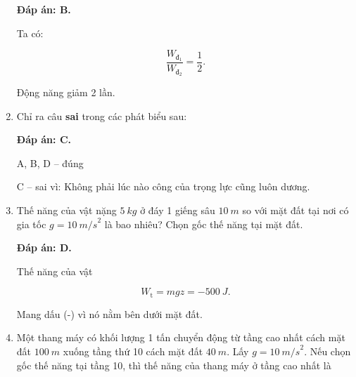 \begin{enumerate}[label=\bfseries Câu \arabic*:, leftmargin=1.5cm]
	\hideall
	{	
		\textbf{Đáp án: B.}
		
		Ta có:
		
		$$\dfrac{W_{\text{đ}_1}}{W_{\text{đ}_2}} = \dfrac{1}{2}.$$
		
		Động năng giảm 2 lần.
	}
	\item {}
	
	
	{Chỉ ra câu \textbf{sai} trong các phát biểu sau:
	}
	
	\hideall
	{	
		\textbf{Đáp án: C.}
		
		A, B, D – đúng
		
		C – sai vì: Không phải lúc nào công của trọng lực cũng luôn dương.
	}
	\item {}
	
	
	{Thế năng của vật nặng $\SI{5}{kg}$ ở đáy 1 giếng sâu $\SI{10}{m}$ so với mặt đất tại nơi có gia tốc $g = \SI{10}{m/s}^2$ là bao nhiêu? Chọn gốc thế năng tại mặt đất.
	}
	
	\hideall
	{	
		\textbf{Đáp án: D.}
		
		Thế năng của vật
		
		$$W_\text{t} = mgz = -\SI{500}{J}.$$
		
		Mang dấu (-)  vì nó nằm bên dưới mặt đất.
	}
	\item {}
	
	
	{Một thang máy có khối lượng 1 tấn chuyển động từ tầng cao nhất cách mặt đất $\SI{100}{m}$ xuống tầng thứ 10 cách mặt đất $\SI{40}{m}$. Lấy $g = \SI{10}{m/s}^2$. Nếu chọn gốc thế năng tại tầng 10, thì thế năng của thang máy ở tầng cao nhất là
	}
	

\end{enumerate}
